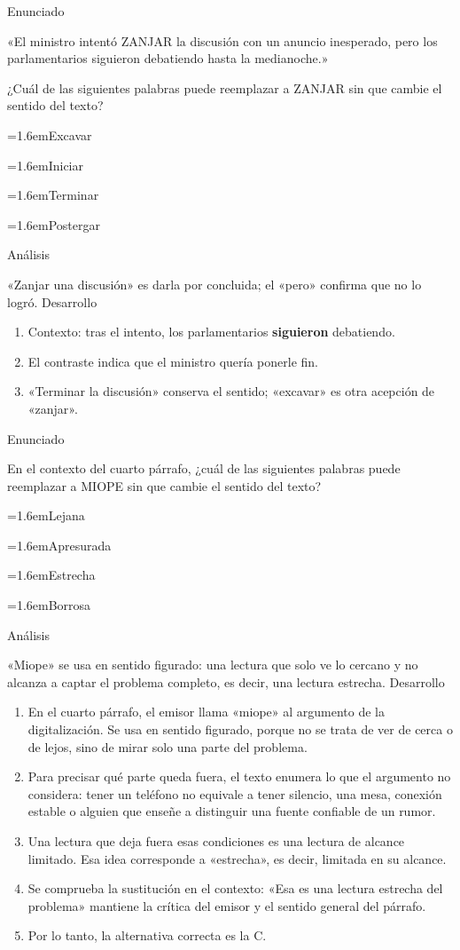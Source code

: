 \documentclass[10pt,a4paper,twocolumn]{article}
\newcommand{\alternativa}[2]{\par\noindent\hangindent=1.6em\hangafter=1\makebox[1.6em][l]{\tecla{#1}}#2\par}
\newcommand{\clave}[1]{\par\smallskip{\sffamily\footnotesize\color{esmeralda} Clave \teclaok{#1}}\par}
\begin{document}
\begin{ejemplo}
{\sffamily\footnotesize\color{zinc500} Enunciado}\par
«El ministro intentó ZANJAR la discusión con un anuncio inesperado, pero los parlamentarios siguieron debatiendo hasta la medianoche.»

¿Cuál de las siguientes palabras puede reemplazar a ZANJAR sin que cambie el sentido del texto?
\alternativa{A}{Excavar}
\alternativa{B}{Iniciar}
\alternativa{C}{Terminar}
\alternativa{D}{Postergar}
\clave{C}
{\sffamily\footnotesize\color{zinc500} Análisis}\par «Zanjar una discusión» es darla por concluida; el «pero» confirma que no lo logró.
{\sffamily\footnotesize\color{zinc500} Desarrollo}
\begin{enumerate}
  \item Contexto: tras el intento, los parlamentarios \textbf{siguieron} debatiendo.
  \item El contraste indica que el ministro quería ponerle fin.
  \item «Terminar la discusión» conserva el sentido; «excavar» es otra acepción de «zanjar».
\end{enumerate}
\end{ejemplo}

\begin{ejemplo}
{\sffamily\footnotesize\color{zinc500} Enunciado}\par
En el contexto del cuarto párrafo, ¿cuál de las siguientes palabras puede reemplazar a MIOPE sin que cambie el sentido del texto?
\alternativa{A}{Lejana}
\alternativa{B}{Apresurada}
\alternativa{C}{Estrecha}
\alternativa{D}{Borrosa}
\clave{C}
{\sffamily\footnotesize\color{zinc500} Análisis}\par «Miope» se usa en sentido figurado: una lectura que solo ve lo cercano y no alcanza a captar el problema completo, es decir, una lectura estrecha.
{\sffamily\footnotesize\color{zinc500} Desarrollo}
\begin{enumerate}
  \item En el cuarto párrafo, el emisor llama «miope» al argumento de la digitalización. Se usa en sentido figurado, porque no se trata de ver de cerca o de lejos, sino de mirar solo una parte del problema.
  \item Para precisar qué parte queda fuera, el texto enumera lo que el argumento no considera: tener un teléfono no equivale a tener silencio, una mesa, conexión estable o alguien que enseñe a distinguir una fuente confiable de un rumor.
  \item Una lectura que deja fuera esas condiciones es una lectura de alcance limitado. Esa idea corresponde a «estrecha», es decir, limitada en su alcance.
  \item Se comprueba la sustitución en el contexto: «Esa es una lectura estrecha del problema» mantiene la crítica del emisor y el sentido general del párrafo.
  \item Por lo tanto, la alternativa correcta es la C.
\end{enumerate}
\end{ejemplo}
\end{document}
